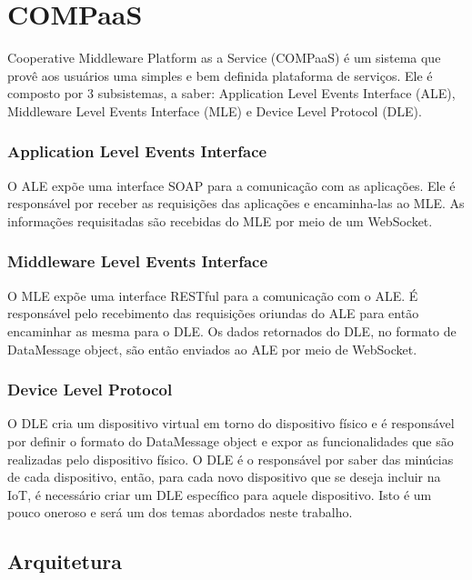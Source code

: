 \section{COMPaaS}
\label{sec:COMPaaS}
Cooperative Middleware Platform as a Service (COMPaaS) é um sistema que provê aos usuários uma simples e bem definida plataforma de serviços.
Ele é composto por 3 subsistemas, a saber:  Application Level Events Interface (ALE), Middleware Level Events Interface (MLE) e Device Level
Protocol (DLE).

\subsubsection{Application Level Events Interface}
O ALE expõe uma interface SOAP para a comunicação com as aplicações. Ele é responsável por receber as requisições das aplicações e encaminha-las ao MLE.
As informações requisitadas são recebidas do MLE por meio de um WebSocket.

\subsubsection{Middleware Level Events Interface}
O MLE expõe uma interface RESTful para a comunicação com o ALE. É responsável pelo recebimento das requisições oriundas do ALE para então encaminhar as mesma
para o DLE. Os dados retornados do DLE, no formato de DataMessage object, são então enviados ao ALE por meio de WebSocket.

\subsubsection{Device Level Protocol}
O DLE cria um dispositivo virtual em torno do dispositivo físico e é responsável por definir o formato do DataMessage object e expor as funcionalidades que
são realizadas pelo dispositivo físico. O DLE é o responsável por saber das minúcias de cada dispositivo, então, para cada novo dispositivo que se deseja
incluir na IoT, é necessário criar um DLE específico para aquele dispositivo. Isto é um pouco oneroso e será um dos temas abordados neste trabalho.

\subsection{Arquitetura}
